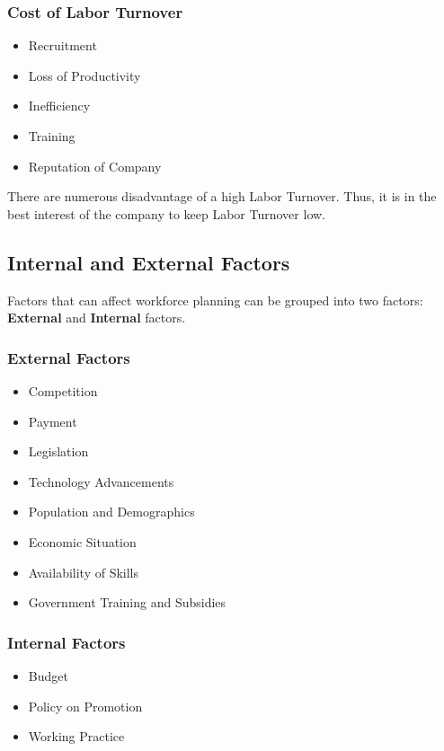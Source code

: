 \documentclass{standalone}
\begin{document}
\subsubsection{Cost of Labor Turnover}
\begin{itemize}
	\item Recruitment
	\item Loss of Productivity
	\item Inefficiency
	\item Training
	\item Reputation of Company
\end{itemize}

There are numerous disadvantage of a high Labor Turnover.
Thus, it is in the best interest of the company to keep Labor Turnover low.

\subsection{Internal and External Factors}

Factors that can affect workforce planning can be grouped into two factors: \textbf{External} and \textbf{Internal} factors.

\subsubsection{External Factors}
\begin{itemize}
	\item Competition
	\item Payment
	\item Legislation
	\item Technology Advancements
	\item Population and Demographics
	\item Economic Situation
	\item Availability of Skills
	\item Government Training and Subsidies
\end{itemize}

\subsubsection{Internal Factors}
\begin{itemize}
	\item Budget
	\item Policy on Promotion
	\item Working Practice
\end{itemize}
\end{document}
